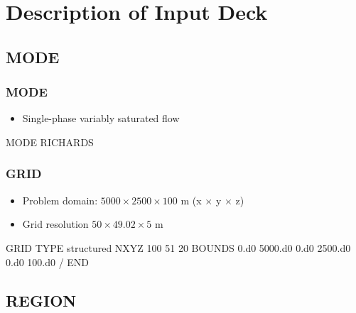 \documentclass{beamer}
\begin{document}
\section{Description of Input Deck}

\subsection{MODE}
\begin{frame}\frametitle{MODE}

\begin{itemize}
  \item Single-phase variably saturated flow
\end{itemize}

\begin{semiverbatim}

MODE RICHARDS
\end{semiverbatim}

\end{frame}

\begin{frame}\frametitle{GRID}

\begin{itemize}
  \item Problem domain: $5000 \times 2500 \times 100$ m (x $\times$ y $\times$ z)
  \item Grid resolution $50 \times 49.02 \times 5$ m
\end{itemize}

\begin{semiverbatim}
GRID
  TYPE structured
  NXYZ 100 51 20
  BOUNDS
    0.d0 5000.d0
    0.d0 2500.d0
    0.d0 100.d0
  /
END
\end{semiverbatim}

\end{frame}

\subsection{REGION}
\end{document}
